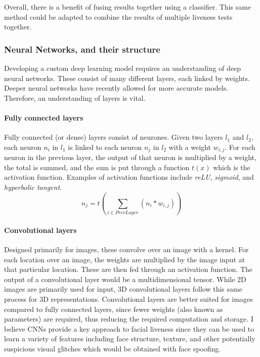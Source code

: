\documentclass[12pt,a4paper]{article}
\begin{document}
        Overall, there is a benefit of fusing results together using a classifier. This same method could be adapted to combine the results of multiple liveness tests together.


        \subsubsection{Neural Networks, and their structure}
        Developing a custom deep learning model requires an understanding of deep neural networks. These consist of many different layers, each linked by weights. Deeper neural networks have recently allowed for more accurate models. Therefore, an understanding of layers is vital.

        \paragraph{Fully connected layers} Fully connected (or dense) layers consist of neurones. Given two layers $l_1$ and $l_2$, each
        neuron $n_i$ in $l_1$ is linked to each neuron $n_j$ in $l_2$ with a weight $w_{i, j}$. For each neuron in the previous layer, the output of that neuron is multiplied by a weight, the total is summed,
        and the sum is put through a function $t(x)$ which is the activation function. Examples of activation functions include \emph{reLU}, \emph{sigmoid}, and \emph{hyperbolic tangent}.
        $$n_j = t(\sum_{i \in PrevLayer}(n_i * w_{i, j}))$$

        \paragraph{Convolutional layers} Designed primarily for images, these convolve over an image with a kernel. For each location over an image, the weights are multiplied by the image input at that particular location. These are then fed through an activation function.
        The output of a convolutional layer would be a multidimensional tensor. While 2D images are primarily used for input, 3D convolutional layers follow this same process for 3D representations. 
        Convolutional layers are better suited for images compared to fully connected layers, since fewer weights (also known as parameters) are required, thus reducing the required computation and storage. I believe CNNs provide a key approach to facial liveness since they can be used to learn a variety of features including face structure,
        texture, and other potentially suspicious visual glitches which would be obtained with face spoofing.
\end{document}
